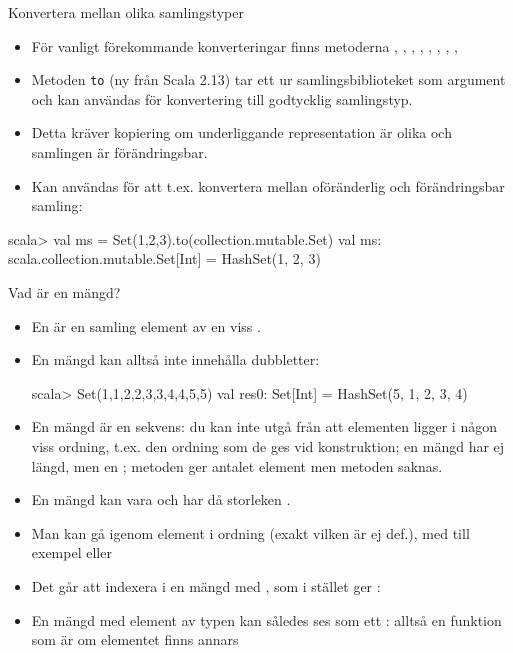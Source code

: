 \begin{Slide}{Konvertera mellan olika samlingstyper}
\begin{itemize}
\item För vanligt förekommande konverteringar finns metoderna , ,  , , , , , ,  
\item Metoden \texttt{to} (ny från Scala 2.13) tar ett  ur samlingsbiblioteket som argument och kan användas för konvertering till godtycklig samlingstyp.
\item Detta kräver kopiering om underliggande representation är olika och samlingen är förändringsbar.
\item Kan användas för att t.ex. konvertera mellan oföränderlig och förändringsbar samling:
\end{itemize}
\begin{REPLnonum}
scala> val ms = Set(1,2,3).to(collection.mutable.Set)
val ms: scala.collection.mutable.Set[Int] = HashSet(1, 2, 3)
\end{REPLnonum}
\end{Slide}




\begin{Slide}{Vad är en mängd?}\SlideFontSmall
\begin{itemize}
\item En  är en samling  element av en viss .
\item En mängd kan alltså inte innehålla dubbletter:
\begin{REPLnonum}
scala> Set(1,1,2,2,3,3,4,4,5,5)
val res0: Set[Int] = HashSet(5, 1, 2, 3, 4)
\end{REPLnonum}
\pause
\item En mängd är   en sekvens: du kan inte utgå från att elementen ligger i någon viss ordning, t.ex. den ordning som de ges vid konstruktion; en mängd har ej längd, men en ; metoden  ger antalet element men metoden  saknas.
\item En mängd kan vara  och har då storleken .
\pause
\item Man kan gå igenom element i  ordning (exakt vilken är ej def.), med till exempel  eller 
\pause
\item Det går  att indexera i en mängd med , som i stället ger : 
\item En mängd  med element av typen  kan således ses som ett : alltså en funktion  som är  om elementet finns annars 
\end{itemize}
\end{Slide}


